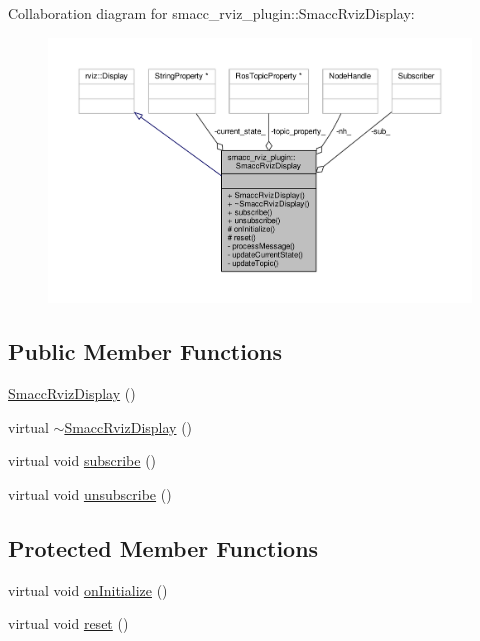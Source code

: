 Collaboration diagram for smacc\+\_\+rviz\+\_\+plugin\+:\+:Smacc\+Rviz\+Display\+:
\nopagebreak
\begin{figure}[H]
\begin{center}
\leavevmode
\includegraphics[width=350pt]{classsmacc__rviz__plugin_1_1SmaccRvizDisplay__coll__graph}
\end{center}
\end{figure}
\subsection*{Public Member Functions}
\begin{DoxyCompactItemize}
\item 
\hyperlink{classsmacc__rviz__plugin_1_1SmaccRvizDisplay_a57d912b6eeec19a0654546bb011fb593}{Smacc\+Rviz\+Display} ()
\item 
virtual \hyperlink{classsmacc__rviz__plugin_1_1SmaccRvizDisplay_aebda19712c75b75a31e90272f472a7e3}{$\sim$\+Smacc\+Rviz\+Display} ()
\item 
virtual void \hyperlink{classsmacc__rviz__plugin_1_1SmaccRvizDisplay_ad774027ba3eda277c991619332495cbb}{subscribe} ()
\item 
virtual void \hyperlink{classsmacc__rviz__plugin_1_1SmaccRvizDisplay_a49a35acd10a664a8335ef5852f8c115c}{unsubscribe} ()
\end{DoxyCompactItemize}
\subsection*{Protected Member Functions}
\begin{DoxyCompactItemize}
\item 
virtual void \hyperlink{classsmacc__rviz__plugin_1_1SmaccRvizDisplay_a8a041fe0d0e88fa0219204c85831d10e}{on\+Initialize} ()
\item 
virtual void \hyperlink{classsmacc__rviz__plugin_1_1SmaccRvizDisplay_af9cf4f5ef4f5fdb2fcb1bf1a81cdac4d}{reset} ()
\end{DoxyCompactItemize}
